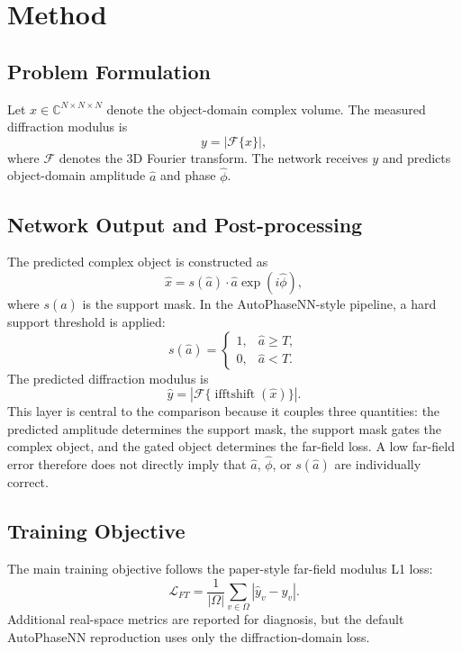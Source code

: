 \section{Method}

\subsection{Problem Formulation}
Let $x \in \mathbb{C}^{N \times N \times N}$ denote the object-domain complex
volume. The measured diffraction modulus is
\begin{equation}
  y = \left|\mathcal{F}\{x\}\right|,
\end{equation}
where $\mathcal{F}$ denotes the 3D Fourier transform. The network receives $y$
and predicts object-domain amplitude $\hat{a}$ and phase $\hat{\phi}$.

\subsection{Network Output and Post-processing}
The predicted complex object is constructed as
\begin{equation}
  \hat{x} = s(\hat{a}) \cdot \hat{a}\exp(i\hat{\phi}),
\end{equation}
where $s(\hat{a})$ is the support mask. In the AutoPhaseNN-style pipeline, a
hard support threshold is applied:
\begin{equation}
  s(\hat{a}) =
  \begin{cases}
  1, & \hat{a} \geq T,\\
  0, & \hat{a} < T.
  \end{cases}
\end{equation}
The predicted diffraction modulus is
\begin{equation}
  \hat{y} = \left|\mathcal{F}\{\operatorname{ifftshift}(\hat{x})\}\right|.
\end{equation}
This layer is central to the comparison because it couples three quantities:
the predicted amplitude determines the support mask, the support mask gates the
complex object, and the gated object determines the far-field loss. A low
far-field error therefore does not directly imply that $\hat{a}$, $\hat{\phi}$,
or $s(\hat{a})$ are individually correct.

\subsection{Training Objective}
The main training objective follows the paper-style far-field modulus L1 loss:
\begin{equation}
  \mathcal{L}_{FT} = \frac{1}{|\Omega|}\sum_{v \in \Omega}
  \left| \hat{y}_v - y_v \right|.
\end{equation}
Additional real-space metrics are reported for diagnosis, but the default
AutoPhaseNN reproduction uses only the diffraction-domain loss.

